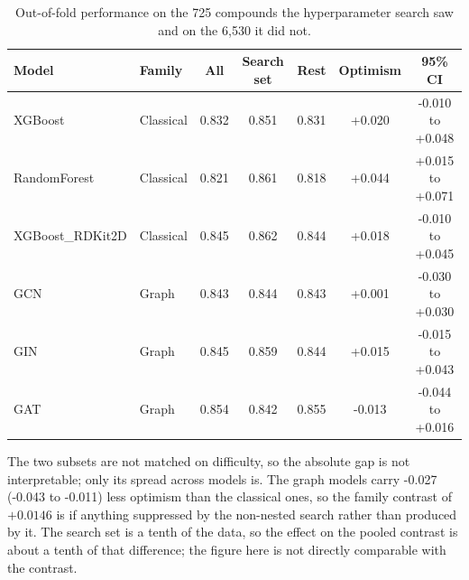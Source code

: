 \begin{table}[htbp]
\centering
\caption{Out-of-fold performance on the 725 compounds the hyperparameter search saw and on the 6,530 it did not.}
\label{tab:si_optimism}
\footnotesize
\setlength{\tabcolsep}{4pt}
\begin{tabular}{llccccc}
\toprule
Model & Family & All & Search set & Rest & Optimism & 95\% CI \\
\midrule
XGBoost & Classical & 0.832 & 0.851 & 0.831 & +0.020 & -0.010 to +0.048 \\
RandomForest & Classical & 0.821 & 0.861 & 0.818 & +0.044 & +0.015 to +0.071 \\
XGBoost\_RDKit2D & Classical & 0.845 & 0.862 & 0.844 & +0.018 & -0.010 to +0.045 \\
GCN & Graph & 0.843 & 0.844 & 0.843 & +0.001 & -0.030 to +0.030 \\
GIN & Graph & 0.845 & 0.859 & 0.844 & +0.015 & -0.015 to +0.043 \\
GAT & Graph & 0.854 & 0.842 & 0.855 & -0.013 & -0.044 to +0.016 \\
\bottomrule
\end{tabular}
\begin{flushleft}\footnotesize The two subsets are not matched on difficulty, so the absolute gap is not interpretable; only its spread across models is. The graph models carry -0.027 (-0.043 to -0.011) less optimism than the classical ones, so the family contrast of $+0.0146$ is if anything suppressed by the non-nested search rather than produced by it. The search set is a tenth of the data, so the effect on the pooled contrast is about a tenth of that difference; the figure here is not directly comparable with the contrast.\end{flushleft}
\end{table}
